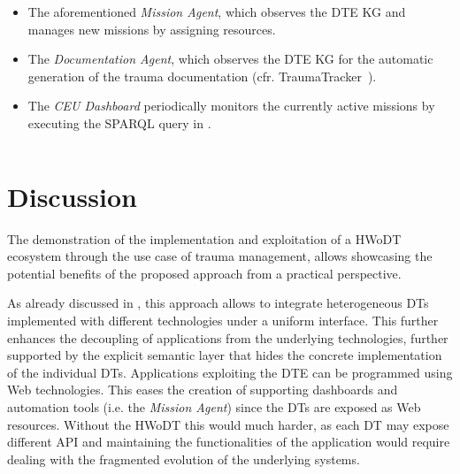 \begin{itemize}
    \item The aforementioned \emph{Mission Agent}, which observes the \ac{DTE} \ac{KG} and manages new missions by assigning resources.
    \item The \emph{Documentation Agent}, which observes the \ac{DTE} \ac{KG} for the automatic generation of the trauma documentation (cfr. TraumaTracker~\cite{Montagna2019}).
    \item The \emph{\ac{CEU} Dashboard} periodically monitors the currently active missions by executing the SPARQL query in .

    \begin{code}
    \label{lst:active-missions-query}
    \inputminted{sparql}{listings/hwodt/use-case/active-missions-query.rq}
    \end{code}
    
\end{itemize}


\section{Discussion}

The demonstration of the implementation and exploitation of a \ac{HWoDT} ecosystem through the use case of trauma management, allows showcasing the potential benefits of the proposed approach from a practical perspective.
%

As already discussed in , this approach allows to integrate heterogeneous \acp{DT} implemented with different technologies under a uniform interface. 
%
This further enhances the decoupling of applications from the underlying technologies, further supported by the explicit semantic layer that hides the concrete implementation of the individual \acp{DT}.
%
Applications exploiting the \ac{DTE} can be programmed using Web technologies. This eases the creation of supporting dashboards and automation tools (i.e. the \emph{Mission Agent}) since the \acp{DT} are exposed as Web resources.
%
Without the \ac{HWoDT} this would much harder, as each \ac{DT} may expose different \ac{API} and maintaining the functionalities of the application would require dealing with the fragmented evolution of the underlying systems.

